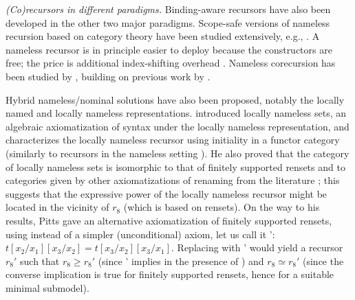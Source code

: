 \smallskip
\textit{(Co)recursors in different paradigms.} 
Binding-aware recursors have also been developed in the other two major 
paradigms. 
%
Scope-safe versions of nameless recursion based on category theory have been studied extensively, e.g.,   \citet{fio-abs,DBLP:conf/lics/Hofmann99,BirdP-lambda,DBLP:conf/csl/AltenkirchR99,allais-bindingsByDependentTypes-agda,DBLP:conf/cpp/KaiserSS18}. 
%
A nameless recursor is in principle %
easier to %
deploy because the %
constructors are free; the price %
is additional index-shifting overhead \cite{DBLP:journals/entcs/BerghoferU07}.   
Nameless corecursion has been studied by  \citet{DBLP:journals/tcs/MatthesU04}, building on previous work by \citet{DBLP:journals/tcs/AczelAMV03,DBLP:journals/tcs/Moss01,DBLP:journals/mscs/GhaniLMP03}. 

Hybrid nameless/nominal solutions have also been proposed, notably 
the locally named \cite{DBLP:journals/jar/McKinnaP99,DBLP:journals/jar/PollackSR12}
and locally nameless \cite{aydemirPOPL08,locallyNameless} representations.  
\citet{pittsLocNamSets} %
introduced locally nameless sets, an algebraic axiomatization of syntax under the locally nameless representation, and characterizes the locally nameless recursor \cite{locallyNameless} using initiality in a functor category (similarly to recursors in the nameless 
setting \cite{fio-abs,DBLP:conf/lics/Hofmann99}).  
He also %
proved that the category of locally nameless sets is isomorphic to that of finitely supported rensets \cite{DBLP:conf/cade/Popescu22} and to categories given by other axiomatizations of renaming from the literature \cite{statonThesis,gabbayHofmann-nominalRenamingSets}; this suggests that the expressive power of the locally nameless recursor might be located in the vicinity of $r_8$ (which is based on rensets).  
%
On the way to his results, Pitts gave an alternative axiomatization of finitely supported rensets, using instead of \RnCh{} a simpler (unconditional) axiom, let us call it \RnCh{}': $t[x_2/x_1][x_3/x_2] = t[x_3/x_2][x_3/x_1]$. Replacing \RnCh{} with \RnCh{}' would yield a recursor $r_8'$ such that $r_8  \geq  r_8'$ (since \RnCh{}' implies \RnCh{} in the presence of \RnIm{}) and $r_8 \simeq r_8'$ (since %
the converse implication %
is true for finitely supported rensets, hence for a suitable minimal submodel).  



